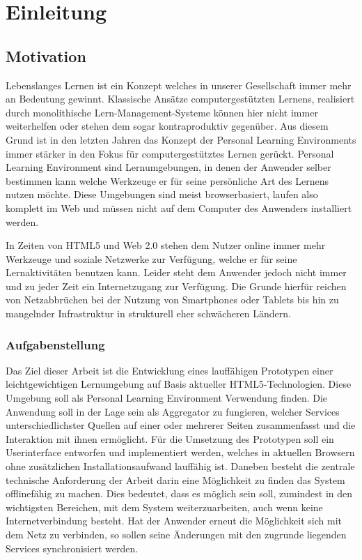 \chapter{Einleitung} 
\label{chapter:Kapitel1}
\section{Motivation}
Lebenslanges Lernen ist ein Konzept welches in unserer Gesellschaft immer mehr an Bedeutung gewinnt. Klassische Ansätze computergestützten Lernens, realisiert durch monolithische Lern-Management-Systeme können hier nicht immer weiterhelfen oder stehen dem sogar kontraproduktiv gegenüber. Aus diesem Grund ist in den letzten Jahren das Konzept der Personal Learning Environments immer stärker in den Fokus für computergestütztes Lernen gerückt. Personal Learning Environment sind Lernumgebungen, in denen der Anwender selber bestimmen kann welche Werkzeuge er für seine persönliche Art des Lernens nutzen möchte. Diese Umgebungen sind meist browserbasiert, laufen also komplett im Web und müssen nicht auf dem Computer des Anwenders installiert werden. 

In Zeiten von HTML5 und Web 2.0 stehen dem Nutzer online immer mehr Werkzeuge und soziale Netzwerke zur Verfügung, welche er für seine Lernaktivitäten benutzen kann. Leider steht dem Anwender jedoch nicht immer und zu jeder Zeit ein Internetzugang zur Verfügung. Die Grunde hierfür reichen von Netzabbrüchen bei der Nutzung von Smartphones oder Tablets bis hin zu mangelnder Infrastruktur in strukturell eher schwächeren Ländern.

\subsection{Aufgabenstellung}
Das Ziel dieser Arbeit ist die Entwicklung eines lauffähigen Prototypen einer leichtgewichtigen Lernumgebung auf Basis aktueller HTML5-Technologien. Diese Umgebung soll als Personal Learning Environment Verwendung finden. Die Anwendung soll in der Lage sein als Aggregator zu fungieren, welcher Services unterschiedlichster Quellen auf einer oder mehrerer Seiten zusammenfasst und die Interaktion mit ihnen ermöglicht. Für die Umsetzung des Prototypen soll ein Userinterface entworfen und implementiert werden, welches in aktuellen Browsern ohne zusätzlichen Installationsaufwand lauffähig ist. Daneben besteht die zentrale technische Anforderung der Arbeit darin eine Möglichkeit zu finden das System offlinefähig zu machen. Dies bedeutet, dass es möglich sein soll, zumindest in den wichtigsten Bereichen, mit dem System weiterzuarbeiten, auch wenn keine Internetverbindung besteht. Hat der Anwender erneut die Möglichkeit sich mit dem Netz zu verbinden, so sollen seine Änderungen mit den zugrunde liegenden Services synchronisiert werden.

